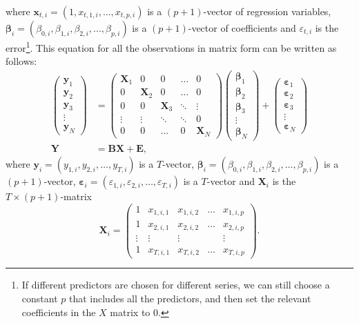 \documentclass[11pt,a4paper,]{article}
\begin{document}
where \(\bm{x}_{t,i}= (1, x_{t,1,i},\dots,x_{t,p,i})\) is a \((p+1)\)-vector of regression variables, \({\bm{\beta}}_i = (\beta_{0,i}, \beta_{1,i}, \beta_{2,i}, \dots, \beta_{p,i})\) is a \((p+1)\)-vector of coefficients and \({\varepsilon}_{t,i}\) is the error\footnote{If different predictors are chosen for different series, we can still choose a constant \(p\) that includes all the predictors, and then set the relevant coefficients in the \(X\) matrix to \(0\).}. This equation for all the observations in matrix form can be written as follows:
\begin{align}\label{eq:linearmodel}
  \begin{pmatrix}
  \bm{y}_1\\
  \bm{y}_2\\
  \bm{y}_3 \\
  \vdots\\
  \bm{y}_N
  \end{pmatrix}&=
  \begin{pmatrix}
  \bm{X}_1 & 0        & 0        & \dots  & 0\\
  0        & \bm{X}_2 & 0        & \dots  & 0\\
  0        & 0        & \bm{X}_3 & \ddots & \vdots \\
  \vdots   & \vdots   & \ddots   & \ddots & 0\\
  0        & 0        & \dots    & 0      & \bm{X}_N
  \end{pmatrix}
  \begin{pmatrix}
  \bm{\beta}_1\\
  \bm{\beta}_2\\
  \bm{\beta}_3\\
  \vdots\\
  \bm{\beta}_N
  \end{pmatrix}+
  \begin{pmatrix}
  \bm{\varepsilon}_1\\
  \bm{\varepsilon}_2\\
  \bm{\varepsilon}_3\\
  \vdots \\
  \bm{\varepsilon}_N
  \end{pmatrix}
  \\[2ex]
  \bm{Y} &= \bm{BX} + \bm{E},
\end{align}
where \(\bm{y}_i = (y_{1,i}, y_{2,i}, \dots, y_{T,i})\) is a \(T\)-vector, \({\bm{\beta}}_i = (\beta_{0,i}, \beta_{1,i}, \beta_{2,i}, \dots, \beta_{p,i})\) is a \((p+1)\)-vector, \({\bm{\varepsilon}}_i = (\varepsilon_{1,i}, \varepsilon_{2,i}, \dots, \varepsilon_{T,i})\) is a \(T\)-vector and \(\bm{X}_i\) is the \(T\times (p+1)\)-matrix
\begin{equation}\label{eq:Xmatrixdefinition}
  \bm{X}_i = \begin{pmatrix}
  1 & x_{1,i,1} & x_{1,i,2} & \dots & x_{1,i,p}\\
  1 & x_{2,i,1} & x_{2,i,2} & \dots & x_{2,i,p}\\
  \vdots & \vdots & \vdots & & \vdots \\
  1 & x_{T,i,1} & x_{T,i,2} & \dots & x_{T,i,p}
\end{pmatrix}.
\end{equation}
\end{document}
